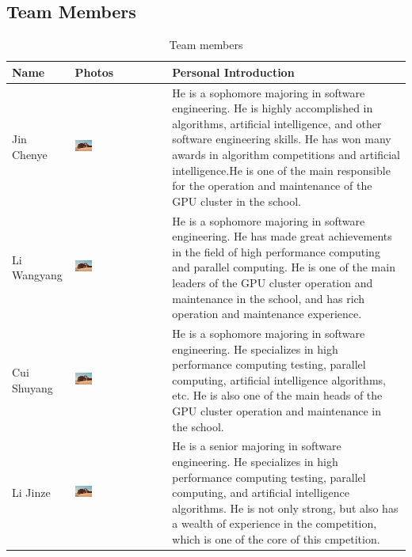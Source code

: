 \documentclass[a4paper,12pt]{article}
\begin{document}
\subsection{Team Members}
\begin{table}[H]
\centering
\caption{Team members}
\begin{tabular}{|l|l|l|}
\hline
Name & Photos & Personal Introduction \\
\hline
Jin Chenye & \includegraphics[width=0.2\textwidth]{Jin_Chenye.png} & He is a sophomore majoring in software engineering. He is highly accomplished in algorithms, artificial intelligence, and other software engineering skills. He has won many awards in algorithm competitions and artificial intelligence.He is one of the main responsible for the operation and maintenance of the GPU cluster in the school. \\
\hline
Li Wangyang & \includegraphics[width=0.2\textwidth]{Li_Wangyang.png} & He is a sophomore majoring in software engineering. He has made great achievements in the field of high performance computing and parallel computing. He is one of the main leaders of the GPU cluster operation and maintenance in the school, and has rich operation and maintenance experience. \\
\hline
Cui Shuyang & \includegraphics[width=0.2\textwidth]{Cui_Shuyang.png} & He is a sophomore majoring in software engineering. He specializes in high performance computing testing, parallel computing, artificial intelligence algorithms, etc. He is also one of the main heads of the GPU cluster operation and maintenance in the school. \\
\hline
Li Jinze & \includegraphics[width=0.2\textwidth]{Li_Jinze.png} & He is a senior majoring in software engineering. He specializes in high performance computing testing, parallel computing, and artificial intelligence algorithms. He is not only strong, but also has a wealth of experience in the competition, which is one of the core of this cmpetition. \\

\end{tabular}
\end{table}
\end{document}
